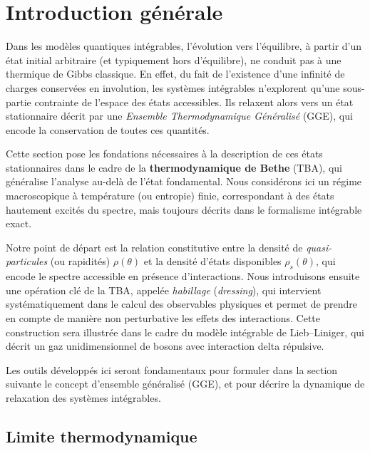 \section{Introduction générale}

Dans les modèles quantiques intégrables, l’évolution vers l’équilibre, à partir d’un état initial arbitraire (et typiquement hors d’équilibre), ne conduit pas à une thermique de Gibbs classique.  
En effet, du fait de l’existence d’une infinité de charges conservées en involution, les systèmes intégrables n’explorent qu’une sous-partie contrainte de l’espace des états accessibles.  
Ils relaxent alors vers un état stationnaire décrit par une \emph{Ensemble Thermodynamique Généralisé} (GGE), qui encode la conservation de toutes ces quantités.

Cette section pose les fondations nécessaires à la description de ces états stationnaires dans le cadre de la \textbf{thermodynamique de Bethe} (TBA), qui généralise l’analyse au-delà de l’état fondamental.  
Nous considérons ici un régime macroscopique à température (ou entropie) finie, correspondant à des états hautement excités du spectre, mais toujours décrits dans le formalisme intégrable exact.

Notre point de départ est la relation constitutive entre la densité de \emph{quasi-particules} (ou rapidités) $\rho(\theta)$ et la densité d’états disponibles $\rho_s(\theta)$, qui encode le spectre accessible en présence d’interactions.  
Nous introduisons ensuite une opération clé de la TBA, appelée \emph{habillage} (\emph{dressing}), qui intervient systématiquement dans le calcul des observables physiques et permet de prendre en compte de manière non perturbative les effets des interactions.  
Cette construction sera illustrée dans le cadre du modèle intégrable de Lieb–Liniger, qui décrit un gaz unidimensionnel de bosons avec interaction delta répulsive.

Les outils développés ici seront fondamentaux pour formuler dans la section suivante le concept d’ensemble généralisé (GGE), et pour décrire la dynamique de relaxation des systèmes intégrables.


\subsection{Limite thermodynamique}

